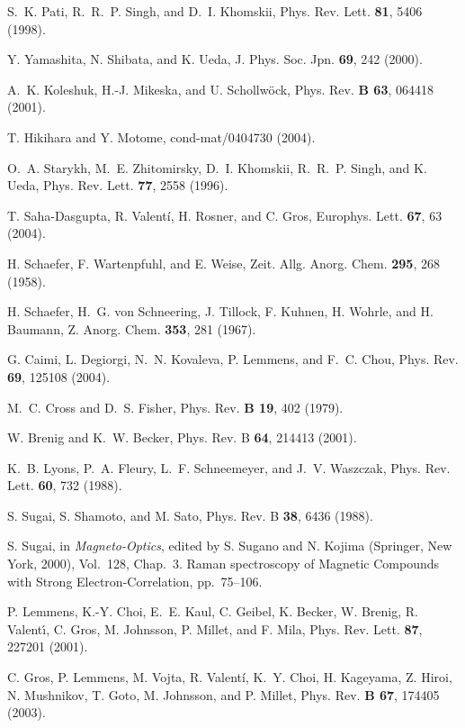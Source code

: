 \documentclass[prb,preprint,draft,amsmath,showpacs]{revtex4}
\begin{document}
\begin{thebibliography}{10}
S.~K. Pati, R.~R.~P. Singh, and D.~I. Khomskii, Phys. Rev. Lett. {\bf 81},
  5406  (1998).

Y. Yamashita, N. Shibata, and K. Ueda, J. Phys. Soc. Jpn. {\bf 69},  242
  (2000).

A.~K. Koleshuk, H.-J. Mikeska, and U. Schollw{\"o}ck, Phys. Rev. {\bf B 63},
  064418  (2001).

T. Hikihara and Y. Motome, cond-mat/0404730  (2004).

O.~A. Starykh, M.~E. Zhitomirsky, D.~I. Khomskii, R.~R.~P. Singh, and K. Ueda,
  Phys. Rev. Lett. {\bf 77},  2558  (1996).

T. Saha-Dasgupta, R. Valent\'{i}, H. Rosner, and C. Gros, Europhys. Lett. {\bf
  67},  63  (2004).

H. Schaefer, F. Wartenpfuhl, and E. Weise, Zeit. Allg. Anorg. Chem. {\bf 295},
  268  (1958).

H. Schaefer, H.~G. von Schneering, J. Tillock, F. Kuhnen, H. Wohrle, and H.
  Baumann, Z. Anorg. Chem. {\bf 353},  281  (1967).

G. Caimi, L. Degiorgi, N.~N. Kovaleva, P. Lemmens, and F.~C. Chou, Phys. Rev.
  {\bf 69},  125108  (2004).

M.~C. Cross and D.~S. Fisher, Phys. Rev. {\bf B 19},  402  (1979).

W. Brenig and K.~W. Becker, Phys. Rev. B {\bf 64},  214413  (2001).

K.~B. Lyons, P.~A. Fleury, L.~F. Schneemeyer, and J.~V. Waszczak, Phys. Rev.
  Lett. {\bf 60},  732  (1988).

S. Sugai, S. Shamoto, and M. Sato, Phys. Rev. B {\bf 38},  6436  (1988).

S. Sugai,  in {\em Magneto-Optics}, edited by S. Sugano and N. Kojima
  (Springer, New York, 2000), Vol.~128, Chap.~3. Raman spectroscopy of Magnetic
  Compounds with Strong Electron-Correlation, pp.\ 75--106.

P. Lemmens, K.-Y. Choi, E.~E. Kaul, C. Geibel, K. Becker, W. Brenig, R.
  Valent\'\i, C. Gros, M. Johnsson, P. Millet, and F. Mila, Phys. Rev. Lett.
  {\bf 87},  227201  (2001).

C. Gros, P. Lemmens, M. Vojta, R. Valent\'{i}, K.~Y. Choi, H. Kageyama, Z.
  Hiroi, N. Mushnikov, T. Goto, M. Johnsson, and P. Millet, Phys. Rev. {\bf B
  67},  174405  (2003).


\end{thebibliography}
\end{document}
